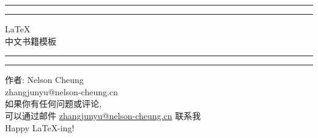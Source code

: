 \begin{titlepage}
	\centering %
	\scshape %
	\vspace*{1.5\baselineskip} %

	\rule{13cm}{1.6pt}\vspace*{-\baselineskip}\vspace*{2pt} %
	\rule{13cm}{0.4pt} %
	
		\vspace{0.75\baselineskip} %
	{	
        \Huge \LaTeX\\ 
			\vspace{4mm}
		中文书籍模板 \\	
    }
		\vspace{0.75\baselineskip} %
	\rule{13cm}{0.4pt}\vspace*{-\baselineskip}\vspace{3.2pt} %
	\rule{13cm}{1.6pt} %
	
		\vspace{1.75\baselineskip} %
	{\large 作者: Nelson Cheung \\
		\vspace*{1.2\baselineskip}
	zhangjunyu@nelson-cheung.cn} \\
	\vfill
如果你有任何问题或评论, \\ \vspace{1mm} 可以通过邮件 \url{zhangjunyu@nelson-cheung.cn} 联系我\\ \vspace{1mm}
Happy \LaTeX-ing!

\end{titlepage}